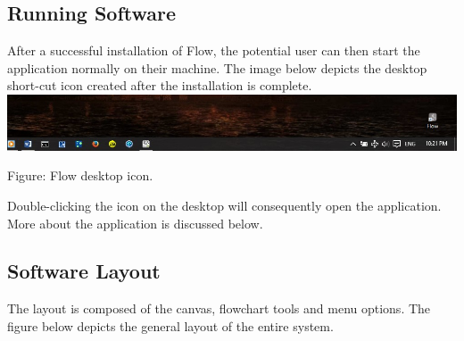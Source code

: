 \documentclass[11pt,a4paper,titlepage]{article}
\begin{document}
	
	\subsection{Running Software}
	
	
		
	
	
		After a successful installation of Flow, the potential user can then start the application normally on their machine. The image below depicts the desktop short-cut icon created after the installation is complete.	\\
		
		\includegraphics[width=14cm]{images/DesktopIcon.jpg}
		\begin{center}
			Figure: Flow desktop icon.\\
		\end{center} 
		
		
		Double-clicking the icon on the desktop will consequently open the application. More about the application is discussed below.
		
		
		\subsection{Software Layout}
		The layout is composed of the canvas, flowchart tools and menu options. The figure below depicts the general layout of the entire system.
		
\end{document}
